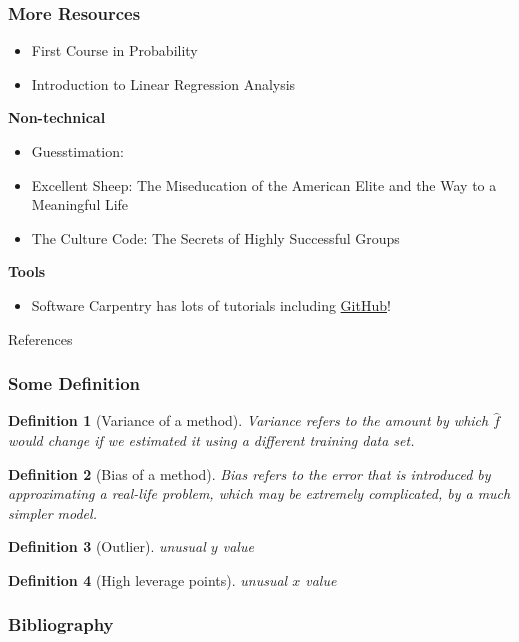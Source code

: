 \documentclass[serif, xcolor={dvipsnames}]{beamer} %
\newtheorem{deff}{Definition}
\begin{document}
\begin{frame}[t]
\frametitle{More Resources}

\begin{itemize}
\item {\scriptsize First Course in Probability~\citep{ross1976first}}
\item {\scriptsize Introduction to Linear Regression Analysis~\citep{montgomery2021introduction}}
\end{itemize}
{\bf \scriptsize  Non-technical}
\begin{itemize}
\item {\scriptsize Guesstimation:~\citep{weinstein2008guesstimation}}
\item {\scriptsize Excellent Sheep: The Miseducation of the American Elite and the Way to a Meaningful Life~\citep{sheep}}
\item {\scriptsize The Culture Code: The Secrets of Highly Successful Groups~\citep{CultureCode}}
\end{itemize}

{\bf \scriptsize  Tools}
\begin{itemize}
\item {\scriptsize Software Carpentry has lots of tutorials including \href{https://swcarpentry.github.io/git-novice/}{GitHub}!}
\end{itemize}
\end{frame}


\begin{frame}[allowframebreaks,t]{References} 
\frametitle{Some Definition}


\begin{deff}[Variance of a method] Variance refers to the amount by which
$\hat f$ would change if we estimated it using a different training data set.
\end{deff}

\begin{deff}[Bias of a method] Bias refers to the error that is introduced by approximating a real-life problem, which may be extremely complicated, by a much simpler model.
\end{deff}

\begin{deff}[Outlier] unusual $y$ value
\end{deff}

\begin{deff}[High leverage points] unusual $x$ value
\end{deff}

\end{frame}


\begin{frame}
\frametitle{Bibliography}
\nocite{*}
\printbibliography

\end{frame}
\end{document}
